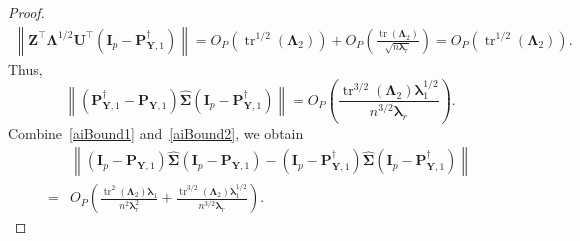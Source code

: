 \documentclass[12pt]{article} %
\DeclareMathOperator{\mytr}{tr}
\newcommand{\bZ}{\mathbf{Z}}
\newcommand{\bP}{\mathbf{P}}
\newcommand{\bY}{\mathbf{Y}}
\newcommand{\bI}{\mathbf{I}}
\newcommand{\bU}{\mathbf{U}}
\newcommand{\bfsym}[1]{\ensuremath{\boldsymbol{#1}}}
\def\blambda {\bfsym {\lambda}}
\def\bLambda {\bfsym {\Lambda}}
\def\bSigma {\bfsym {\Sigma}}
\theoremstyle{definition}
\begin{document}
\begin{appendices}
\begin{proof}
\begin{equation*}
        \begin{split}
        \left\|
        \bZ^\top \bLambda^{1/2}\bU^\top (\bI_p-\bP^\dagger_{\bY,1})  
        \right\|
         = 
         O_P\left(
             \mytr^{1/2}(\bLambda_2)
         \right)
         +O_P\left(
             \frac{\mytr(\bLambda_2)}{\sqrt{n\blambda_r}}
         \right)
         = 
         O_P\left(
             \mytr^{1/2}(\bLambda_2)
         \right).
        \end{split}
    \end{equation*}
    Thus,
    \begin{equation}\label{aiBound2}
    \left\|(\bP^\dagger_{\bY,1}-\bP_{\bY,1})\hat{\bSigma}(\bI_p-\bP^\dagger_{\bY,1})\right\|
             =O_P\left(
                 \frac{\mytr^{3/2}(\bLambda_2)\blambda_1^{1/2}}{n^{3/2}\blambda_r}
                \right).
    \end{equation}
    Combine~\eqref{aiBound1} and~\eqref{aiBound2}, we obtain
    \begin{equation*}
        \begin{split}
             &\left\|(\bI_p -\bP_{\bY,1})\hat{\bSigma}(\bI_p -\bP_{\bY,1})
             -
             (\bI_p-\bP^\dagger_{\bY,1})\hat{\bSigma}(\bI_p-\bP^\dagger_{\bY,1})\right\|
             \\
             =&
             O_P\left(
                    \frac{\mytr^2(\bLambda_2)\blambda_1}{n^2 \blambda_r^2}
                 +
                 \frac{\mytr^{3/2}(\bLambda_2)\blambda_1^{1/2}}{n^{3/2}\blambda_r}
                \right).
        \end{split}
    \end{equation*}


\end{proof}
\end{appendices}
\end{document}
